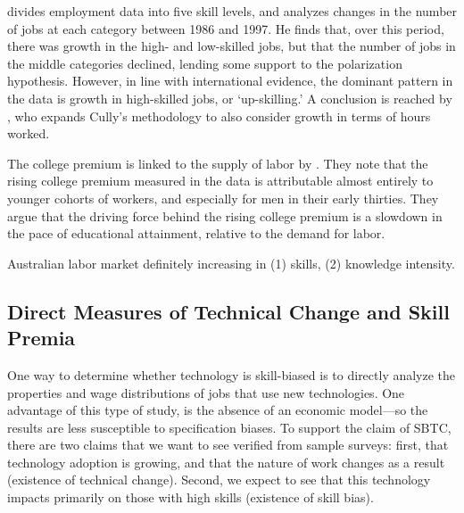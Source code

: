 \citet{Cully1999} divides employment data into five skill levels, and analyzes changes in the number of jobs at each category between 1986 and 1997. He finds that, over this period, there was growth in the high- and low-skilled jobs, but that the number of jobs in the middle categories declined, lending some support to the polarization hypothesis. However, in line with international evidence, the dominant pattern in the data is growth in high-skilled jobs, or `up-skilling.' A conclusion is reached by \cite{Wooden2000}, who expands Cully's methodology to also consider growth in terms of hours worked.

The college premium is linked to the supply of labor by \cite{Card2001}. They note that the rising college premium measured in the data is attributable almost entirely to younger cohorts of workers, and especially for men in their early thirties. They argue that the driving force behind the rising college premium is a slowdown in the pace of educational attainment, relative to the demand for labor.

Australian labor market definitely increasing in (1) skills, (2) knowledge intensity. \citet{Esposto2012} \citet{Esposto2011} \cite{Borland1999}


\subsection{Direct Measures of Technical Change and Skill Premia}

One way to determine whether technology is skill-biased is to directly analyze the properties and wage distributions of jobs that use new technologies. One advantage of this type of study, is the absence of an economic model---so the results are less susceptible to specification biases. To support the claim of SBTC, there are two claims that we want to see verified from sample surveys: first, that technology adoption is growing, and that the nature of work changes as a result (existence of technical change). Second, we expect to see that this technology impacts primarily on those with high skills (existence of skill bias).

